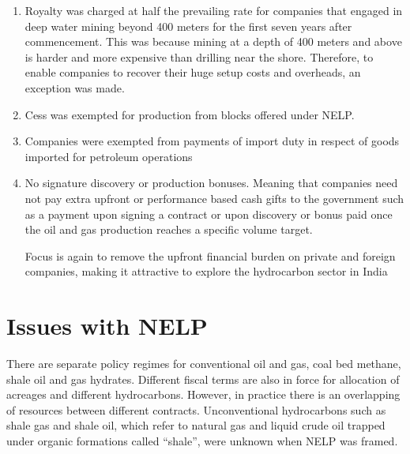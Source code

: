 \documentclass[12pt]{article}
\begin{document}
\begin{enumerate}
\begin{enumerate}
        Normally under a carried interest setup the government or the state-owned company gets a free percentage share in an oil block. The private company spends 100\% of the capital investment required for drilling, survey and exploration and if no oil is found the private company loses its money while the government is owed nothing. Conversely if oil is found the private company covers the upfront cost and gradually recovers the expense out of the future oil sales once it reaches a profit making stage it is split between the state and the private entity.

        The objective here is to allow the state to take a share in the successful project without taking up high upfront financial risk. Before the NELP ONGC and OIL were granted oil fields on a nomination basis and offers held mandatory stakes or carried rights in the blocks allowing them a split of the profit without the excessive upfront financial overhead. In order to create a level playing field the automatic free equity stakes granted to ONGC and OIL were no longer valid
        \item Royalty was charged at half the prevailing rate for companies that engaged in deep water mining beyond 400 meters for the first seven years after commencement. This was because mining at a depth of 400 meters and above is harder and more expensive than drilling near the shore. Therefore, to enable companies to recover their huge setup costs and overheads, an exception was made.
        \item Cess was exempted for production from blocks offered under NELP.
        \item Companies were exempted from payments of import duty in respect of goods imported for petroleum operations
        \item No signature discovery or production bonuses. Meaning that companies need not pay extra upfront or performance based cash gifts to the government such as a payment upon signing a contract or upon discovery or bonus paid once the oil and gas production reaches a specific volume target.

        Focus is again to remove the upfront financial burden on private and foreign companies, making it attractive to explore the hydrocarbon sector in India
    \end{enumerate}
\end{enumerate}
\section*{Issues with NELP}
There are separate policy regimes for conventional oil and gas, coal bed methane, shale oil and gas hydrates. Different fiscal terms are also in force for allocation of acreages and different hydrocarbons. However, in practice there is an overlapping of resources between different contracts. Unconventional hydrocarbons such as shale gas and shale oil, which refer to natural gas and liquid crude oil trapped under organic formations called ``shale'', were unknown when NELP was framed.
\end{document}
